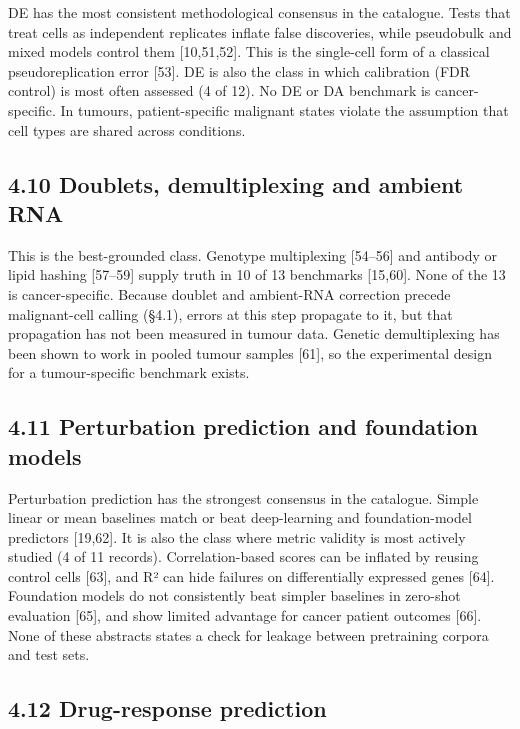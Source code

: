\documentclass[11pt]{article}
\begin{document}
DE has the most consistent methodological consensus in the catalogue.
Tests that treat cells as independent replicates inflate false
discoveries, while pseudobulk and mixed models control them
{[}10,51,52{]}. This is the single-cell form of a classical
pseudoreplication error {[}53{]}. DE is also the class in which
calibration (FDR control) is most often assessed (4 of 12). No DE or DA
benchmark is cancer-specific. In tumours, patient-specific malignant
states violate the assumption that cell types are shared across
conditions.

\subsection{4.10 Doublets, demultiplexing and ambient RNA}\label{doublets-demultiplexing-and-ambient-rna}

This is the best-grounded class. Genotype multiplexing {[}54--56{]} and
antibody or lipid hashing {[}57--59{]} supply truth in 10 of 13
benchmarks {[}15,60{]}. None of the 13 is cancer-specific. Because
doublet and ambient-RNA correction precede malignant-cell calling
(§4.1), errors at this step propagate to it, but that propagation has
not been measured in tumour data. Genetic demultiplexing has been shown
to work in pooled tumour samples {[}61{]}, so the experimental design
for a tumour-specific benchmark exists.

\subsection{4.11 Perturbation prediction and foundation models}\label{perturbation-prediction-and-foundation-models}

Perturbation prediction has the strongest consensus in the catalogue.
Simple linear or mean baselines match or beat deep-learning and
foundation-model predictors {[}19,62{]}. It is also the class where
metric validity is most actively studied (4 of 11 records).
Correlation-based scores can be inflated by reusing control cells
{[}63{]}, and R² can hide failures on differentially expressed genes
{[}64{]}. Foundation models do not consistently beat simpler baselines
in zero-shot evaluation {[}65{]}, and show limited advantage for cancer
patient outcomes {[}66{]}. None of these abstracts states a check for
leakage between pretraining corpora and test sets.

\subsection{4.12 Drug-response prediction}\label{drug-response-prediction}
\end{document}
